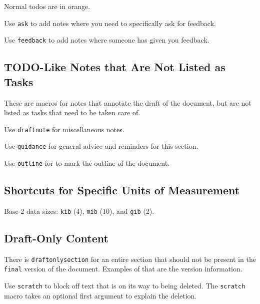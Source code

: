 Normal todos are in orange.

Use \lstinline{ask} to add notes where you need to specifically ask for feedback.

Use \lstinline{feedback} to add notes where someone has given you feedback.



\subsection{TODO-Like Notes that Are Not Listed as Tasks}

These are macros for notes that annotate the draft of the document,
but are not listed as tasks that need to be taken care of.

Use \lstinline{draftnote} for miscellaneous notes.

Use \lstinline{guidance} for general advice and reminders for this section.

Use \lstinline{outline} for to mark the outline of the document.



\subsection{Shortcuts for Specific Units of Measurement}

Base-2 data sizes:
\lstinline{kib} (\SI{4}{\kib}),
\lstinline{mib} (\SI{10}{\mib}),
and
\lstinline{gib} (\SI{2}{\gib}).



\subsection{Draft-Only Content}

There is \lstinline{draftonlysection} for an entire section that should not be present in the \lstinline{final} version of the document.
Examples of that are the version information.

Use \lstinline{scratch} to block off text that is on its way to being deleted.
The \lstinline{scratch} macro takes an optional first argument to explain the deletion.

